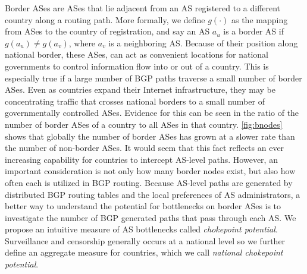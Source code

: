 Border ASes are ASes that lie adjacent from an AS registered to a different
country along a routing path. More formally, we define $g(\cdot)$ as the
mapping from ASes to the country of registration, and say an AS $a_u$ is a border
AS if $g(a_u) \neq g(a_v)$, where $a_v$ is a neighboring AS.  Because of their
position along national border, these ASes, can act as convenient locations for
national governments to control information flow into or out of a country. This
is especially true if a large number of BGP paths traverse a small number of
border ASes. Even as countries expand their Internet infrastructure, they may
be concentrating traffic that crosses national borders to a small number of
governmentally controlled ASes.  Evidence for this can be seen in the ratio of
the number of border ASes of a country to all ASes in that country.
\figurename \ref{fig:bnodes} shows that globally the number of border ASes has
grown at a slower rate than the number of non-border ASes.
It would seem that this fact reflects an ever increasing capability for countries
to intercept AS-level paths.  However, an important consideration is not only
how many border nodes exist, but also how often each is utilized in BGP
routing. Because AS-level paths are generated by distributed BGP routing tables
and the local preferences of AS administrators, a better way to understand the
potential for bottlenecks on border ASes is to investigate the number of BGP
generated paths that pass through each AS. We propose an intuitive measure of
AS bottlenecks called \emph{chokepoint potential}. Surveillance and censorship
generally occurs at a national level so we further define an aggregate measure
for countries, which we call \emph{national chokepoint potential}.


